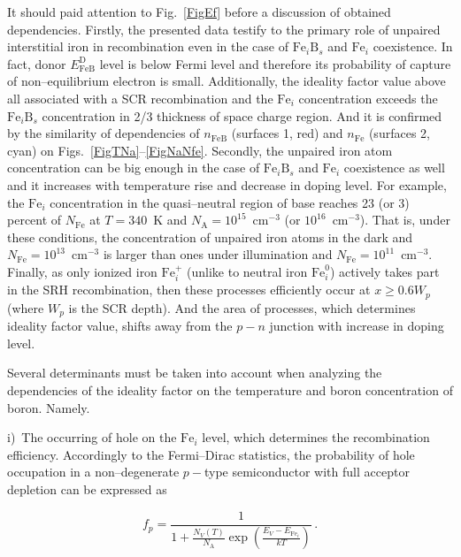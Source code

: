 ﻿\documentclass[12pt]{article}
\begin{document}
It should paid attention to Fig.~\ref{FigEf} before a discussion of obtained dependencies.
Firstly, the presented data testify to the primary role of unpaired interstitial iron in recombination
even in the case of $\mathrm{Fe}_i\mathrm{B}_s$ and $\mathrm{Fe}_i$ coexistence.
In fact, donor $E_{\mathrm{FeB}}^\mathrm{D}$ level is below Fermi level
and therefore its probability of capture of non--equilibrium electron is small.
Additionally, the ideality factor value above all associated with a SCR recombination
and the $\mathrm{Fe}_i$ concentration exceeds the $\mathrm{Fe}_i\mathrm{B}_s$ concentration in 2/3 thickness of space charge region.
And it is confirmed by the similarity of dependencies of $n_\mathrm{FeB}$ (surfaces 1, red) and $n_\mathrm{Fe}$ (surfaces 2, cyan)
on Figs.~\ref{FigTNa}--\ref{FigNaNfe}.
Secondly, the unpaired iron atom concentration can be big enough in the case of $\mathrm{Fe}_i\mathrm{B}_s$ and $\mathrm{Fe}_i$ coexistence as well
and it increases with temperature rise and decrease in doping level.
For example, the $\mathrm{Fe}_i$ concentration in the quasi--neutral region of base
reaches 23 (or 3) percent of $N_\mathrm{Fe}$ at $T=340$~K and $N_\mathrm{A}=10^{15}$~cm$^{-3}$ (or $10^{16}$~cm$^{-3}$).
That is, under these conditions, the concentration of unpaired iron atoms in the dark and $N_\mathrm{Fe}=10^{13}$~cm$^{-3}$ is larger
than ones under illumination and $N_\mathrm{Fe}=10^{11}$~cm$^{-3}$.
Finally,
as only ionized iron $\mathrm{Fe}_i^+$ (unlike to neutral iron $\mathrm{Fe}_i^0$) actively takes  part in the SRH recombination,
then these processes efficiently occur at $x\geq0.6W_p$ (where $W_p$ is the SCR depth).
And the area of processes, which determines ideality factor value,
shifts away from the $p-n$ junction with increase in doping level.

Several determinants must be taken into account when analyzing the dependencies of the ideality factor on the temperature and boron concentration of boron.
Namely.

i)~The occurring of hole on the $\mathrm{Fe}_i$ level, which determines the recombination efficiency.
Accordingly to the Fermi--Dirac statistics,
the probability of hole occupation in  a non--degenerate $p-$type semiconductor with full acceptor depletion
can be expressed as

\begin{equation}
\label{eqfp}
 f_p=\frac{1}{1+\frac{N_V(T)}{N_\mathrm{A}}\exp\left(\frac{E_V-E_{\mathrm{Fe}_i}}{kT}\right)}\,.
\end{equation}
\end{document}
